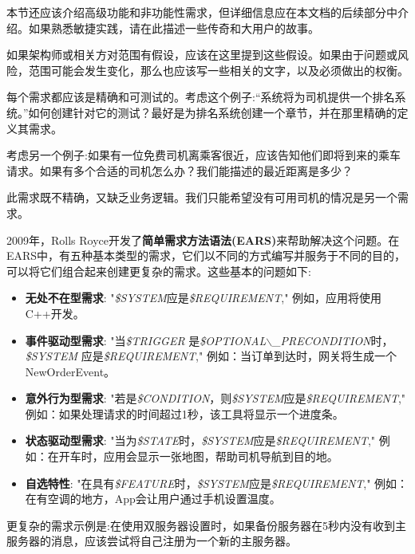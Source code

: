 本节还应该介绍高级功能和非功能性需求，但详细信息应在本文档的后续部分中介绍。如果熟悉敏捷实践，请在此描述一些传奇和大用户的故事。

如果架构师或相关方对范围有假设，应该在这里提到这些假设。如果由于问题或风险，范围可能会发生变化，那么也应该写一些相关的文字，以及必须做出的权衡。


每个需求都应该是精确和可测试的。考虑这个例子:“系统将为司机提供一个排名系统。”如何创建针对它的测试？最好是为排名系统创建一个章节，并在那里精确的定义其需求。

考虑另一个例子:如果有一位免费司机离乘客很近，应该告知他们即将到来的乘车请求。如果有多个合适的司机怎么办？我们能描述的最近距离是多少？

此需求既不精确，又缺乏业务逻辑。我们只能希望没有可用司机的情况是另一个需求。

2009年，Rolls Royce开发了\textbf{简单需求方法语法(EARS)}来帮助解决这个问题。在EARS中，有五种基本类型的需求，它们以不同的方式编写并服务于不同的目的，可以将它们组合起来创建更复杂的需求。这些基本的问题如下:

\begin{itemize}
\item 
\textbf{无处不在型需求}: "\textit{\$SYSTEM}应是\textit{\$REQUIREMENT}," 例如，应用将使用C++开发。

\item 
\textbf{事件驱动型需求}: "当\textit{\$TRIGGER} 是\textit{\$OPTIONAL$\backslash$\_PRECONDITION}时，\textit{\$SYSTEM}
应是\textit{\$REQUIREMENT}," 例如：当订单到达时，网关将生成一个NewOrderEvent。

\item 
\textbf{意外行为型需求}: "若是\textit{\$CONDITION}，则\textit{\$SYSTEM}应是\textit{\$REQUIREMENT}," 例如：如果处理请求的时间超过1秒，该工具将显示一个进度条。

\item
\textbf{状态驱动型需求}: "当为\textit{\$STATE}时，\textit{\$SYSTEM}应是\textit{\$REQUIREMENT}," 例如：在开车时，应用会显示一张地图，帮助司机导航到目的地。

\item
\textbf{自选特性}: "在具有\textit{\$FEATURE}时，\textit{\$SYSTEM}应是\textit{\$REQUIREMENT}," 例如：在有空调的地方，App会让用户通过手机设置温度。
\end{itemize}

更复杂的需求示例是:在使用双服务器设置时，如果备份服务器在5秒内没有收到主服务器的消息，应该尝试将自己注册为一个新的主服务器。

